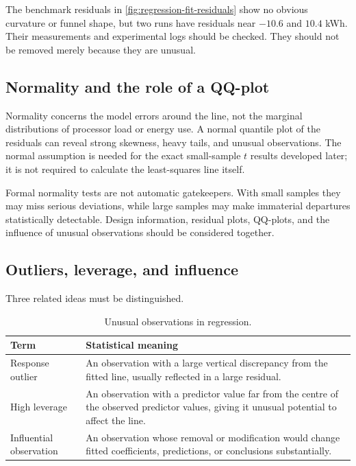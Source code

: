 \FloatBarrier

The benchmark residuals in \autoref{fig:regression-fit-residuals} show no obvious curvature or funnel shape, but two runs have residuals near $-10.6$ and $10.4$ kWh. Their measurements and experimental logs should be checked. They should not be removed merely because they are unusual.

\subsection{Normality and the role of a QQ-plot}

Normality concerns the model errors around the line, not the marginal distributions of processor load or energy use. A normal quantile plot of the residuals can reveal strong skewness, heavy tails, and unusual observations. The normal assumption is needed for the exact small-sample $t$ results developed later; it is not required to calculate the least-squares line itself.

Formal normality tests are not automatic gatekeepers. With small samples they may miss serious deviations, while large samples may make immaterial departures statistically detectable. Design information, residual plots, QQ-plots, and the influence of unusual observations should be considered together.

\subsection{Outliers, leverage, and influence}

Three related ideas must be distinguished.

\begin{table}[htbp]
\centering
\caption{Unusual observations in regression.}
\label{tab:regression-unusual-observations}
\begin{tabularx}{\textwidth}{@{}l>{\raggedright\arraybackslash}X@{}}
\toprule
Term & Statistical meaning \\
\midrule
Response outlier & An observation with a large vertical discrepancy from the fitted line, usually reflected in a large residual. \\
High leverage & An observation with a predictor value far from the centre of the observed predictor values, giving it unusual potential to affect the line. \\
Influential observation & An observation whose removal or modification would change fitted coefficients, predictions, or conclusions substantially. \\
\bottomrule
\end{tabularx}
\end{table}

